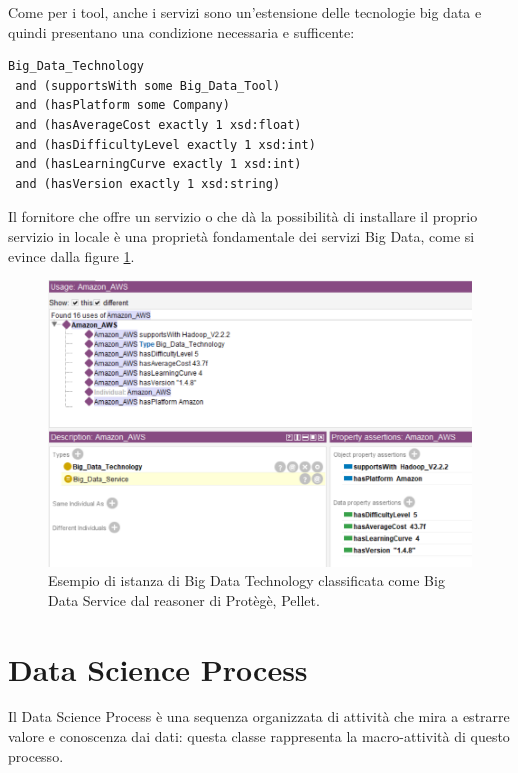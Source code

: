 Come per i tool, anche i servizi sono un'estensione delle tecnologie big data e quindi presentano una condizione necessaria e sufficente:
\begin{verbatim}
Big_Data_Technology
 and (supportsWith some Big_Data_Tool)
 and (hasPlatform some Company)
 and (hasAverageCost exactly 1 xsd:float)
 and (hasDifficultyLevel exactly 1 xsd:int)
 and (hasLearningCurve exactly 1 xsd:int)
 and (hasVersion exactly 1 xsd:string)
\end{verbatim}

Il fornitore che offre un servizio o che dà la possibilità di installare il proprio servizio in locale è una proprietà fondamentale dei servizi Big Data, come si evince dalla figure \ref{fig:awsex_graph}.

\begin{figure}[H]
    \centering
    \includegraphics[width=15cm]{docs/images/awsex.PNG}
    \caption{Esempio di istanza di Big Data Technology classificata come Big Data Service dal reasoner di Protègè, Pellet.}
    \label{fig:awsex_graph}
\end{figure}

\section{Data Science Process}
Il Data Science Process è una sequenza organizzata di attività che mira a estrarre valore e conoscenza dai dati: questa classe rappresenta la macro-attività di questo processo.\\

